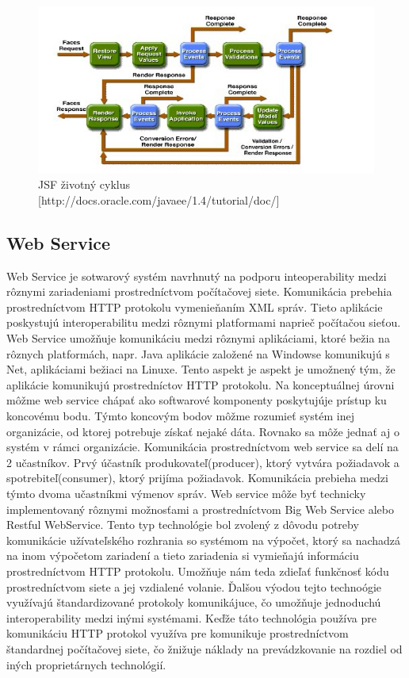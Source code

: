 \begin{figure}[htb]

\begin{center}

\includegraphics[scale=0.5]{jsflifecycle.jpg} 
\caption{JSF životný cyklus [http://docs.oracle.com/javaee/1.4/tutorial/doc/] }
\label{lifecycle}

\end{center}

\end{figure}

\subsection{Web Service}
Web Service  je sotwarový systém navrhnutý na podporu inteoperability medzi rôznymi zariadeniami prostredníctvom počítačovej siete. Komunikácia prebehia prostredníctvom HTTP protokolu vymenieňaním XML správ. Tieto aplikácie poskystujú interoperabilitu medzi rôznymi platformami naprieč počítačou sieťou. Web Service umožňuje komunikáciu medzi rôznymi aplikáciami, ktoré bežia na rôznych platformách, napr. Java aplikácie založené na Windowse komunikujú s Net, aplikáciami bežiaci na Linuxe. Tento aspekt je aspekt je umožnený tým, že aplikácie komunikujú prostredníctov HTTP protokolu. Na konceptuálnej úrovni môžme web service chápať ako softwarové komponenty poskytujúje prístup ku koncovému bodu. Týmto koncovým bodov môžme rozumieť systém inej organizácie, od ktorej potrebuje získať nejaké dáta. Rovnako sa môže jednať aj o systém v rámci organizácie. Komunikácia prostredníctvom web service sa delí na 2 učastníkov. Prvý účastník produkovateľ(producer), ktorý vytvára požiadavok a spotrebiteľ(consumer), ktorý prijíma požiadavok. Komunikácia prebieha medzi týmto dvoma učastníkmi výmenov správ. Web service môže byť technicky implementovaný rôznymi možnosťami a prostredníctvom Big Web Service alebo Restful WebService. Tento typ technológie bol zvolený z dôvodu potreby komunikácie užívateľského rozhrania so systémom na výpočet, ktorý sa nachadzá na inom výpočetom zariadení a tieto zariadenia si vymieňajú informáciu prostredníctvom HTTP protokolu. Umožňuje nám teda zdieľať funkčnosť kódu prostredníctvom siete a jej vzdialené volanie. Ďalšou výodou tejto technoógie využívajú štandardizované protokoly komunikájuce, čo umožňuje jednoduchú interoperability medzi inými systémami. Keďže táto technológia používa pre komunikáciu HTTP protokol využíva pre komunikuje prostredníctvom štandardnej počítačovej siete, čo žnižuje náklady na prevádzkovanie na rozdiel od iných proprietárnych technológií.

